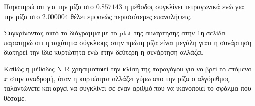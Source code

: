 \documentclass[12pt]{article}
\begin{document}
Παρατηρώ οτι για την ρίζα στο $0.857143$ η μέθοδος συγκλίνει τετραγωνικά
ενώ για την ρίζα στο $2.000004$ θέλει εμφανώς περισσότερες επαναλήψεις.

Συγκρίνοντας αυτό το διάγραμμα με το plot της συνάρτησης στην 1η σελίδα
παρατηρώ οτι η ταχύτητα σύγκλισης στην πρώτη ρίζα είναι μεγάλη γιατι η
συνάρτηση διατηρεί την ίδια κυρτώτητα ενώ στην δεύτερη η συνάρτηση αλλάζει.

Καθώς η μέθοδος N-R χρησιμοποιεί την κλίση της παραγόγου για να βρεί το
επόμενο $x$ στην αναδρομή, όταν η κυρτώτητα αλλάζει γύρω απο την ρίζα
ο αλγόριθμος ταλαντώνετε και αργεί να συγκλίνει σε έναν αριθμό που να ικανοποιεί
το σφάλμα που θέσαμε.
\end{document}
